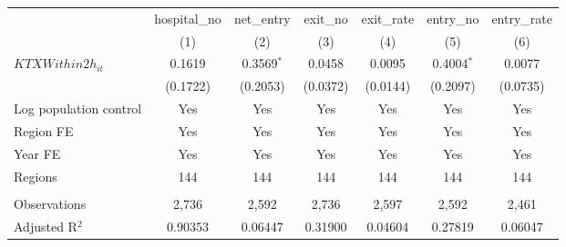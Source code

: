 \begingroup
\centering
\begin{tabular}{lcccccc}
   \toprule
                          & hospital\_no  & net\_entry   & exit\_no  & exit\_rate  & entry\_no    & entry\_rate \\    
                          & (1)           & (2)          & (3)       & (4)         & (5)          & (6)\\  
   \midrule 
   $KTXWithin2h_{it}$     & 0.1619        & 0.3569$^{*}$ & 0.0458    & 0.0095      & 0.4004$^{*}$ & 0.0077\\   
                          & (0.1722)      & (0.2053)     & (0.0372)  & (0.0144)    & (0.2097)     & (0.0735)\\   
   Log population control & Yes           & Yes          & Yes       & Yes         & Yes          & Yes\\  
   Region FE              & Yes           & Yes          & Yes       & Yes         & Yes          & Yes\\  
   Year FE                & Yes           & Yes          & Yes       & Yes         & Yes          & Yes\\  
   Regions                & 144           & 144          & 144       & 144         & 144          & 144\\  
    \\
   Observations           & 2,736         & 2,592        & 2,736     & 2,597       & 2,592        & 2,461\\  
   Adjusted R$^2$         & 0.90353       & 0.06447      & 0.31900   & 0.04604     & 0.27819      & 0.06047\\  
   \bottomrule
\end{tabular}
\par\endgroup

